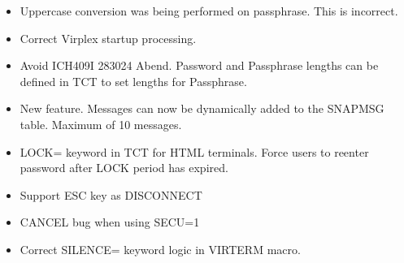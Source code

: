 \documentclass[letterpaper,10pt,english]{sphinxmanual}
\begin{document}
\sphinxAtStartPar
{}
\begin{itemize}
\item {} 
\sphinxAtStartPar
Uppercase conversion was being performed on passphrase. This is incorrect.

\end{itemize}

\sphinxAtStartPar
{}
\begin{itemize}
\item {} 
\sphinxAtStartPar
Correct Virplex startup processing.

\end{itemize}

\sphinxAtStartPar
{}
\begin{itemize}
\item {} 
\sphinxAtStartPar
Avoid ICH409I 283\sphinxhyphen{}024 Abend. Password and Passphrase lengths can be defined in TCT to set lengths for Passphrase.

\end{itemize}

\sphinxAtStartPar
{}
\begin{itemize}
\item {} 
\sphinxAtStartPar
New feature. Messages can now be dynamically added to the SNAPMSG table. Maximum of 10 messages.

\end{itemize}

\sphinxAtStartPar
{}
\begin{itemize}
\item {} 
\sphinxAtStartPar
LOCK= keyword in TCT for HTML terminals. Force users to re\sphinxhyphen{}enter password after LOCK period has expired.

\item {} 
\sphinxAtStartPar
Support ESC key as DISCONNECT

\item {} 
\sphinxAtStartPar
CANCEL bug when using SECU=1

\end{itemize}

\sphinxAtStartPar
{}
\begin{itemize}
\item {} 
\sphinxAtStartPar
Correct SILENCE= keyword logic in VIRTERM macro.

\end{itemize}
\end{document}
